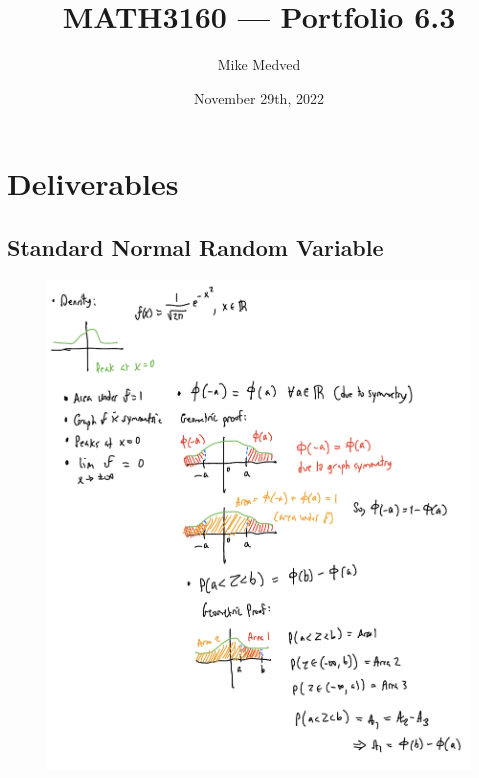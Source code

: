 \documentclass{article}
\title{MATH3160 — Portfolio 6.3}
\author{Mike Medved}
\date{November 29th, 2022}
\begin{document}
\maketitle

\section{Deliverables}

\subsection{Standard Normal Random Variable}

\begin{figure}[!htb]
    \begin{minipage}[b]{0.5\textwidth}
        \centering
        \includegraphics[scale=0.25]{q1.jpeg}
    \end{minipage}
    \begin{minipage}[b]{0.5\textwidth}
        \centering

\end{minipage}
\end{figure}
\end{document}
